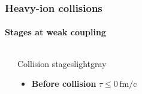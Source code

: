 \documentclass[aspectratio=169,11pt,usenames,dvipsnames]{beamer}
\begin{document}
\begin{frame}
    \frametitle{Heavy-ion collisions}
    \framesubtitle{Stages at weak coupling}
    \vspace{-15pt}
    \begin{columns}[onlytextwidth,t]
            \begin{center}
                \vspace{-5pt}
            \end{center}
            \vspace{10pt}
            \begin{center}
            \begin{custombox2}{\color{normal}Collision stages}{lightgray}
                \small
                \begin{varwidth}{0.8\textwidth}
                \begin{itemize}\itemsep0em 
                    \item {{\bfseries\color{isgold}Before collision} {\scriptsize $\tau\leq 0\,\mathrm{fm/c}$}}\\[1pt]

\end{itemize}
\end{varwidth}
\end{custombox2}
\end{center}
\end{columns}
\end{frame}
\end{document}

